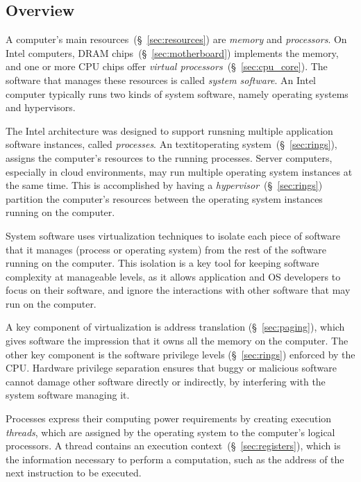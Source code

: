 \subsection{Overview}
\label{sec:background_overview}

A computer's main resources~(\S~\ref{sec:resources}) are \textit{memory} and
\textit{processors}. On Intel computers, DRAM
chips~(\S~\ref{sec:motherboard}) implements the memory, and one or more CPU
chips offer \textit{virtual processors}~(\S~\ref{sec:cpu_core}). The software
that manages these resources is called \textit{system software}. An Intel
computer typically runs two kinds of system software, namely operating systems
and hypervisors.

The Intel architecture was designed to support runsning multiple application
software instances, called \textit{processes}. An
textit{operating system}~(\S~\ref{sec:rings}), assigns the computer's resources
to the running processes. Server computers, especially in cloud environments,
may run multiple operating system instances at the same time. This is
accomplished by having a \textit{hypervisor}~(\S~\ref{sec:rings}) partition the
computer's resources between the operating system instances running on the
computer.

System software uses virtualization techniques to isolate each piece of
software that it manages (process or operating system) from the rest of the
software running on the computer. This isolation is a key tool for keeping
software complexity at manageable levels, as it allows application and OS
developers to focus on their software, and ignore the interactions with other
software that may run on the computer.

A key component of virtualization is address translation (\S~\ref{sec:paging}),
which gives software the impression that it owns all the memory on the
computer. The other key component is the software privilege levels
(\S~\ref{sec:rings}) enforced by the CPU. Hardware privilege separation ensures
that buggy or malicious software cannot damage other software directly or
indirectly, by interfering with the system software managing it.

Processes express their computing power requirements by creating execution
\textit{threads}, which are assigned by the operating system to the computer's
logical processors. A thread contains an execution
context~(\S~\ref{sec:registers}), which is the information necessary to
perform a computation, such as the address of the next instruction to be
executed.

